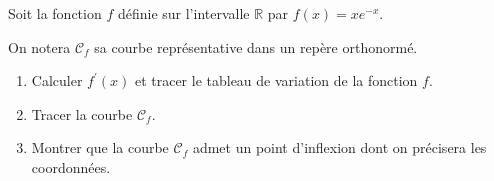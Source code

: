 
%
Soit la fonction $f$ définie sur l'intervalle $\mathbb{R}$ par $f\left(x\right)=xe^{-x}$.
\par
On notera   $\mathscr C_{f}$ sa courbe représentative dans un repère orthonormé.
\begin{enumerate}
     \item
     Calculer $f^{\prime}\left(x\right)$ et tracer le tableau de variation de la fonction $f$.
     \item
     Tracer la courbe $\mathscr C_{f}$.
     \item
     Montrer que la courbe $\mathscr C_{f}$ admet un point d'inflexion dont on précisera les coordonnées.
\end{enumerate}
